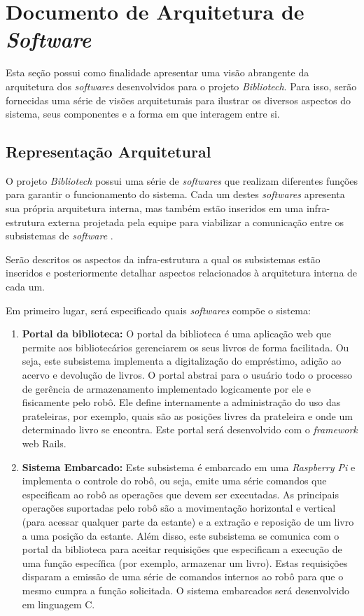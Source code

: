 \chapter[Documento de Arquitetura de Software]{Documento de Arquitetura de \textit{Software}}
Esta seção possui como finalidade apresentar uma visão abrangente da arquitetura dos \textit{softwares} desenvolvidos para o projeto \textit{Bibliotech}. Para isso, serão fornecidas uma série de visões arquiteturais para ilustrar os diversos aspectos do sistema, seus componentes e a forma em que interagem entre si.

\section{Representação Arquitetural}
O projeto \textit{Bibliotech} possui uma série de \textit{softwares} que realizam diferentes funções para garantir o funcionamento do sistema. Cada um destes \textit{softwares} apresenta sua própria arquitetura interna, mas também estão inseridos em uma infra-estrutura externa projetada pela equipe para viabilizar a comunicação entre os subsistemas de \textit{software} . 

Serão descritos os aspectos da infra-estrutura a qual os subsistemas estão inseridos e posteriormente detalhar aspectos relacionados à arquitetura interna de cada um.

Em primeiro lugar, será especificado quais \textit{softwares} compõe o sistema:

\begin{enumerate}
    \item\textbf{Portal da biblioteca:} O portal da biblioteca é uma aplicação web que permite aos bibliotecários gerenciarem os seus livros de forma facilitada. Ou seja, este subsistema implementa a digitalização do empréstimo, adição ao acervo e devolução de livros. O portal abstrai para o usuário todo o processo de gerência de armazenamento implementado logicamente por ele e fisicamente pelo robô. Ele define internamente a administração do uso das prateleiras, por exemplo, quais são as posições livres da prateleira e onde um determinado livro se encontra. Este portal será desenvolvido com o \textit{framework} web Rails.

    \item\textbf{Sistema Embarcado:} Este subsistema é embarcado em uma \textit{Raspberry Pi} e implementa o controle do robô, ou seja, emite uma série comandos que especificam ao robô as operações que devem ser executadas. As principais operações suportadas pelo robô são a movimentação horizontal e vertical (para acessar qualquer parte da estante) e a extração e reposição de um livro a uma posição da estante. Além disso, este subsistema se comunica com o portal da biblioteca para aceitar requisições que especificam a execução de uma função específica (por exemplo, armazenar um livro). Estas requisições disparam a emissão de uma série de comandos internos ao robô para que o mesmo cumpra a função solicitada. O sistema embarcados será desenvolvido em linguagem C.
\end{enumerate}

